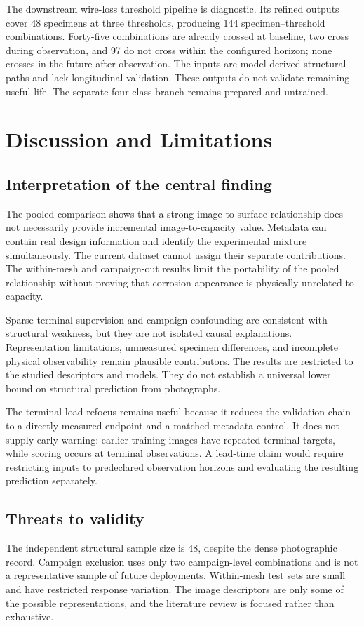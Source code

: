 \documentclass[conference]{IEEEtran}
\begin{document}
The downstream wire-loss threshold pipeline is diagnostic. Its refined outputs cover 48 specimens at three thresholds, producing 144 specimen--threshold combinations. Forty-five combinations are already crossed at baseline, two cross during observation, and 97 do not cross within the configured horizon; none crosses in the future after observation. The inputs are model-derived structural paths and lack longitudinal validation. These outputs do not validate remaining useful life. The separate four-class branch remains prepared and untrained.

\section{Discussion and Limitations}
\subsection{Interpretation of the central finding}
The pooled comparison shows that a strong image-to-surface relationship does not necessarily provide incremental image-to-capacity value. Metadata can contain real design information and identify the experimental mixture simultaneously. The current dataset cannot assign their separate contributions. The within-mesh and campaign-out results limit the portability of the pooled relationship without proving that corrosion appearance is physically unrelated to capacity.

Sparse terminal supervision and campaign confounding are consistent with structural weakness, but they are not isolated causal explanations. Representation limitations, unmeasured specimen differences, and incomplete physical observability remain plausible contributors. The results are restricted to the studied descriptors and models. They do not establish a universal lower bound on structural prediction from photographs.

The terminal-load refocus remains useful because it reduces the validation chain to a directly measured endpoint and a matched metadata control. It does not supply early warning: earlier training images have repeated terminal targets, while scoring occurs at terminal observations. A lead-time claim would require restricting inputs to predeclared observation horizons and evaluating the resulting prediction separately.

\subsection{Threats to validity}
The independent structural sample size is 48, despite the dense photographic record. Campaign exclusion uses only two campaign-level combinations and is not a representative sample of future deployments. Within-mesh test sets are small and have restricted response variation. The image descriptors are only some of the possible representations, and the literature review is focused rather than exhaustive.
\end{document}
